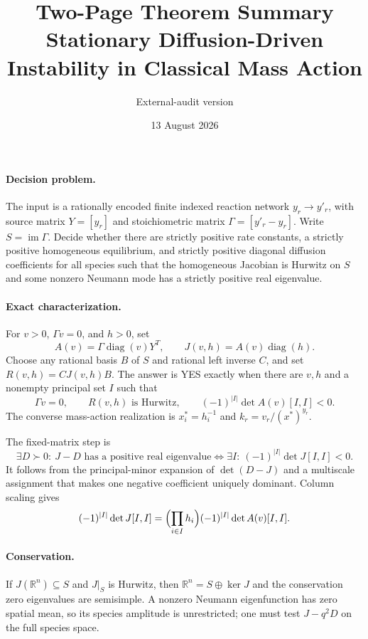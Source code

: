 \documentclass[10pt]{article}
\title{Two-Page Theorem Summary\\\large Stationary Diffusion-Driven Instability in Classical Mass Action}
\author{External-audit version}
\date{13 August 2026}
\newcommand{\diag}{\operatorname{diag}}
\newcommand{\im}{\operatorname{im}}
\newcommand{\R}{\mathbb R}
\begin{document}
\maketitle
\vspace{-1.5em}

\paragraph{Decision problem.}
The input is a rationally encoded finite indexed reaction network
$y_r\to y'_r$, with source matrix $Y=[y_r]$ and stoichiometric matrix
$\Gamma=[y'_r-y_r]$.  Write $S=\im\Gamma$.  Decide whether there are strictly
positive rate constants, a strictly positive homogeneous equilibrium, and
strictly positive diagonal diffusion coefficients for all species such that
the homogeneous Jacobian is Hurwitz on $S$ and some nonzero Neumann mode has a
strictly positive real eigenvalue.

\paragraph{Exact characterization.}
For $v>0$, $\Gamma v=0$, and $h>0$, set
\[
 A(v)=\Gamma\diag(v)Y^T,
 \qquad J(v,h)=A(v)\diag(h).
\]
Choose any rational basis $B$ of $S$ and rational left inverse $C$, and set
$R(v,h)=CJ(v,h)B$.  The answer is YES exactly when there are $v,h$ and a
nonempty principal set $I$ such that
\[
 \Gamma v=0,
 \qquad R(v,h)\text{ is Hurwitz},
 \qquad (-1)^{|I|}\det A(v)[I,I]<0.
\]
The converse mass-action realization is
$x_i^*=h_i^{-1}$ and $k_r=v_r/(x^*)^{y_r}$.

The fixed-matrix step is
\[
 \exists D\succ0:\ J-D\text{ has a positive real eigenvalue}
 \iff
 \exists I:\ (-1)^{|I|}\det J[I,I]<0.
\]
It follows from the principal-minor expansion of $\det(D-J)$ and a multiscale
assignment that makes one negative coefficient uniquely dominant.  Column
scaling gives
\[
 (-1)^{|I|}\det J[I,I]
 =\Bigl(\prod_{i\in I}h_i\Bigr)(-1)^{|I|}\det A(v)[I,I].
\]

\paragraph{Conservation.}
If $J(\R^n)\subseteq S$ and $J|_S$ is Hurwitz, then
$\R^n=S\oplus\ker J$ and the conservation zero eigenvalues are semisimple.
A nonzero Neumann eigenfunction has zero spatial mean, so its species
amplitude is unrestricted; one must test $J-q^2D$ on the full species space.
\end{document}
